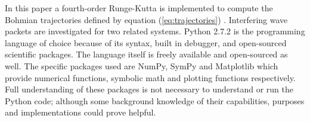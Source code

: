 \documentclass[10pt, reqno]{article}
\begin{document}
  In this paper a fourth-order Runge-Kutta is implemented to compute the Bohmian trajectories defined by equation (\ref{eq:trajectories}) \cite{dowsa}.
  Interfering wave packets are investigated for two related systems.
  Python 2.7.2 is the programming language of choice because of its syntax, built in debugger, and open-sourced scientific packages.
  The language itself is freely available and open-sourced as well.
  The specific packages used are NumPy, SymPy and Matplotlib which provide numerical functions, symbolic math and plotting functions respectively.
  Full understanding of these packages is not necessary to understand or run the Python code; 
    although some background knowledge of their capabilities, purposes and implementations could prove helpful.

\end{document}
